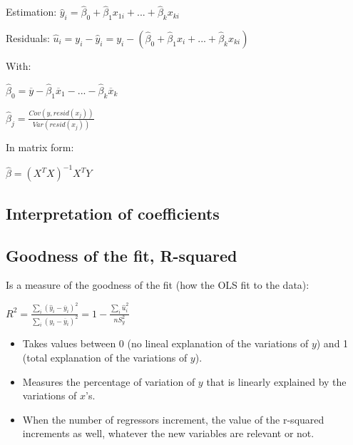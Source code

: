 \documentclass[10pt,landscape]{article}
\begin{document}
\begin{multicols}{3}
Estimation: $\hat{y}_i = \hat{\beta}_0 + \hat{\beta}_1 x_{1i} + ... + \hat{\beta}_k x_{ki}$

Residuals: $\hat{u}_i = y_i - \hat{y}_i = y_i - (\hat{\beta}_0 + \hat{\beta}_1 x_i + ... + \hat{\beta}_k x_{ki})$

With:

$\hat{\beta}_0 = \overline{y} - \hat{\beta}_1 \overline{x}_1 - ... - \hat{\beta}_k \overline{x}_k$

$\hat{\beta}_j = \frac{Cov(y, resid(x_j))}{Var(resid(x_j))}$

In matrix form:

$\hat{\beta} = (X^T X)^{-1} X^T Y$

\subsection*{Interpretation of coefficients}


\subsection*{Goodness of the fit, R-squared}

Is a measure of the goodness of the fit (how the OLS fit to the data):

$R^2 = \frac{\sum_i (\hat{y}_i - \overline{y}_i)^2}{\sum_i (y_i - \overline{y}_i)^2} = 1 - \frac{\sum_i \hat{u}_i^2}{nS_y^2}$

\begin{itemize}[leftmargin=*]
\item Takes values between 0 (no lineal explanation of the variations of $y$) and 1 (total explanation of the variations of $y$).
\item Measures the percentage of variation of $y$ that is linearly explained by the variations of $x$'s.
\item When the number of regressors increment, the value of the r-squared increments as well, whatever the new variables are relevant or not.
\end{itemize}


\end{multicols}
\end{document}
